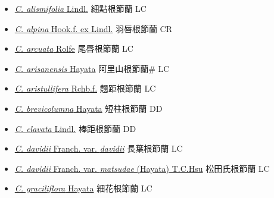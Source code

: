 \begin{itemize}
  \begin{itemize}
        \item[] \href{http://www.theplantlist.org/tpl1.1/search?q=Calanthe+alismifolia}{\textit{C. alismifolia} Lindl.}   細點根節蘭 LC
        \item[] \href{http://www.theplantlist.org/tpl1.1/search?q=Calanthe+alpina}{\textit{C. alpina} Hook.f. ex Lindl.}   羽唇根節蘭 CR
        \item[] \href{http://www.theplantlist.org/tpl1.1/search?q=Calanthe+arcuata}{\textit{C. arcuata} Rolfe}   尾唇根節蘭 LC
        \item[] \href{http://www.theplantlist.org/tpl1.1/search?q=Calanthe+arisanensis}{\textit{C. arisanensis} Hayata}   阿里山根節蘭\# LC
        \item[] \href{http://www.theplantlist.org/tpl1.1/search?q=Calanthe+aristullifera}{\textit{C. aristullifera} Rchb.f.}   翹距根節蘭 LC
        \item[] \href{http://www.theplantlist.org/tpl1.1/search?q=Calanthe+brevicolumna}{\textit{C. brevicolumna} Hayata}   短柱根節蘭 DD
        \item[] \href{http://www.theplantlist.org/tpl1.1/search?q=Calanthe+clavata}{\textit{C. clavata} Lindl.}   棒距根節蘭 DD
        \item[] \href{http://www.theplantlist.org/tpl1.1/search?q=Calanthe+davidii+var.+davidii}{\textit{C. davidii} Franch. var. \textit{davidii}}   長葉根節蘭 LC
        \item[] \href{http://www.theplantlist.org/tpl1.1/search?q=Calanthe+davidii+var.+matsudae}{\textit{C. davidii} Franch. var. \textit{matsudae} (Hayata) T.C.Hsu}   松田氏根節蘭 LC
        \item[] \href{http://www.theplantlist.org/tpl1.1/search?q=Calanthe+graciliflora}{\textit{C. graciliflora} Hayata}   細花根節蘭 LC

\end{itemize}
\end{itemize}
